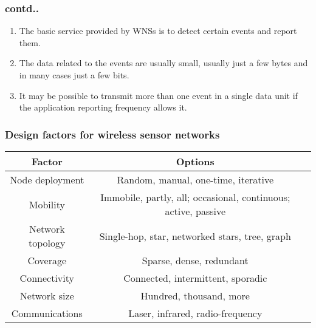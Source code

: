 \documentclass[11pt]{beamer}
\begin{document}
		\begin{frame}
		\frametitle{contd..}
		\begin{enumerate}
			\item The basic service provided by WNSs is to detect certain events and report them.
			\item The data related to the events are usually small, usually just a few bytes and in many cases just a few bits.
			\item It may be possible to transmit more than one event in a single data unit if the application reporting frequency allows it.
		\end{enumerate}
		\end{frame}
		\begin{frame}
			\frametitle{Design factors for wireless sensor networks}
			\begin{tabular}{|c|c|c|}
				\hline
				\textbf{Factor} & \textbf{Options} \\
				\hline
				Node deployment & Random, manual, one-time, iterative\\
				\hline
				Mobility & Immobile, partly, all; occasional, continuous; active, passive\\
				\hline
				Network topology & Single-hop, star, networked stars, tree, graph\\
				\hline
				Coverage &  Sparse, dense, redundant\\
				\hline
				Connectivity & Connected, intermittent, sporadic\\
				\hline
				Network size &  Hundred, thousand, more\\
				\hline
				Communications & Laser, infrared, radio-frequency\\
				\hline
			\end{tabular}
		\end{frame}
\end{document}

